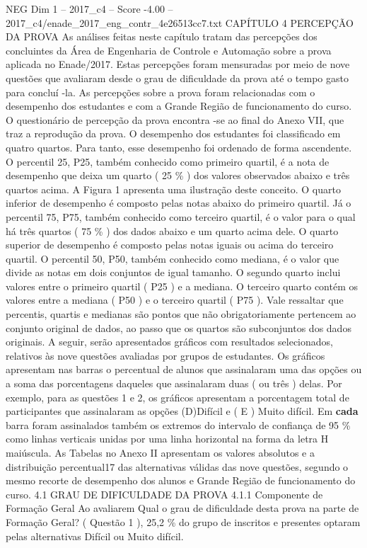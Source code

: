 \begin{textsample}{NEG Dim 1 – 2017\_c4 – Score -4.00 – 2017\_c4/enade\_2017\_eng\_contr\_4e26513cc7.txt}  \label{ex:f1_neg_164}
CAPÍTULO 4 PERCEPÇÃO DA PROVA As análises feitas neste capítulo tratam das percepções dos concluintes da Área de Engenharia de Controle e Automação sobre a prova aplicada no Enade/2017.
Estas percepções foram mensuradas por meio de nove questões que avaliaram desde o grau de dificuldade da prova até o tempo gasto para concluí -la.
As percepções sobre a prova foram relacionadas com o desempenho dos estudantes e com a Grande Região de funcionamento do curso.
O questionário de percepção da prova encontra -se ao final do Anexo VII, que traz a reprodução da prova.
O desempenho dos estudantes foi classificado em quatro quartos.
Para tanto, esse desempenho foi ordenado de forma ascendente.
O percentil 25, P25, também conhecido como primeiro quartil, é a nota de desempenho que deixa um quarto ( 25 \% ) dos valores observados abaixo e três quartos acima.
A Figura 1 apresenta uma ilustração deste conceito.
O quarto inferior de desempenho é composto pelas notas abaixo do primeiro quartil.
Já o percentil 75, P75, também conhecido como terceiro quartil, é o valor para o qual há três quartos ( 75 \% ) dos dados abaixo e um quarto acima dele.
O quarto superior de desempenho é composto pelas notas iguais ou acima do terceiro quartil.
O percentil 50, P50, também conhecido como mediana, é o valor que divide as notas em dois conjuntos de igual tamanho.
O segundo quarto inclui valores entre o primeiro quartil ( P25 ) e a mediana.
O terceiro quarto contém os valores entre a mediana ( P50 ) e o terceiro quartil ( P75 ).
Vale ressaltar que percentis, quartis e medianas são pontos que não obrigatoriamente pertencem ao conjunto original de dados, ao passo que os quartos são subconjuntos dos dados originais.
A seguir, serão apresentados gráficos com resultados selecionados, relativos às nove questões avaliadas por grupos de estudantes.
Os gráficos apresentam nas barras o percentual de alunos que assinalaram uma das opções ou a soma das porcentagens daqueles que assinalaram duas ( ou três ) delas.
Por exemplo, para as questões 1 e 2, os gráficos apresentam a porcentagem total de participantes que assinalaram as opções (D)Difícil e ( E ) Muito difícil.
Em \textbf{cada} barra foram assinalados também os extremos do intervalo de confiança de 95 \% como linhas verticais unidas por uma linha horizontal na forma da letra H maiúscula.
As Tabelas no Anexo II apresentam os valores absolutos e a distribuição percentual17 das alternativas válidas das nove questões, segundo o mesmo recorte de desempenho dos alunos e Grande Região de funcionamento do curso. 4.1 GRAU DE DIFICULDADE DA PROVA 4.1.1 Componente de Formação Geral Ao avaliarem Qual o grau de dificuldade desta prova na parte de Formação Geral? ( Questão 1 ), 25,2 \% do grupo de inscritos e presentes optaram pelas alternativas Difícil ou Muito difícil.

\end{textsample}
